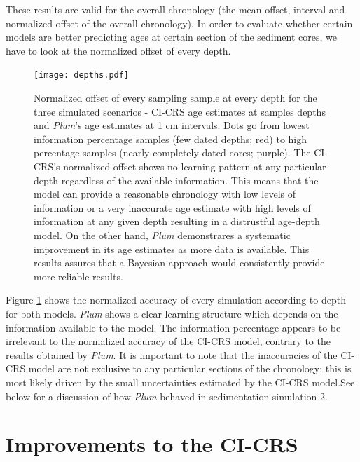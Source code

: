 \documentclass [10pt] {article}
\begin{document}
These results are valid for the overall chronology (the mean offset, interval and normalized offset of the overall chronology). 
In order to evaluate whether certain models are better predicting ages at certain section of the sediment cores, we have to look at the normalized offset of every depth. 


\begin{figure}[!]
	\begin{centering}
		\texttt{[image: depths.pdf]}
		\caption{Normalized offset of every sampling sample at every depth for the three simulated scenarios - CI-CRS age estimates at samples depths and \textit{Plum}'s age estimates at 1 cm intervals. Dots go from lowest information percentage samples (few dated depths; red) to high percentage samples (nearly completely dated cores; purple). The CI-CRS's normalized offset shows no learning pattern at any particular depth regardless of the available information. This means that the model can provide a reasonable chronology with low levels of information or a very inaccurate age estimate with high levels of information at any given depth resulting in a distrustful age-depth model. On the other hand, \textit{Plum} demonstrares a systematic improvement in its age estimates as more data is available. This results assures that a Bayesian approach would consistently provide more reliable results.     }
		\label{fig:depths}
	\end{centering}
\end{figure}

Figure \ref{fig:depths} shows the normalized accuracy of every simulation according to depth for both models.
\textit{Plum} shows a clear learning structure which depends on the information available to the model.
The information percentage appears to be irrelevant to the normalized accuracy of the CI-CRS model, contrary to the results obtained by \textit{Plum}.
It is important to note that the inaccuracies of the CI-CRS model are not exclusive to any particular sections of the chronology; this is most likely driven by the small uncertainties estimated by the CI-CRS model.See below for a discussion of how \textit{Plum} behaved in sedimentation simulation 2.   



\section{Improvements to the CI-CRS}
\end{document}

